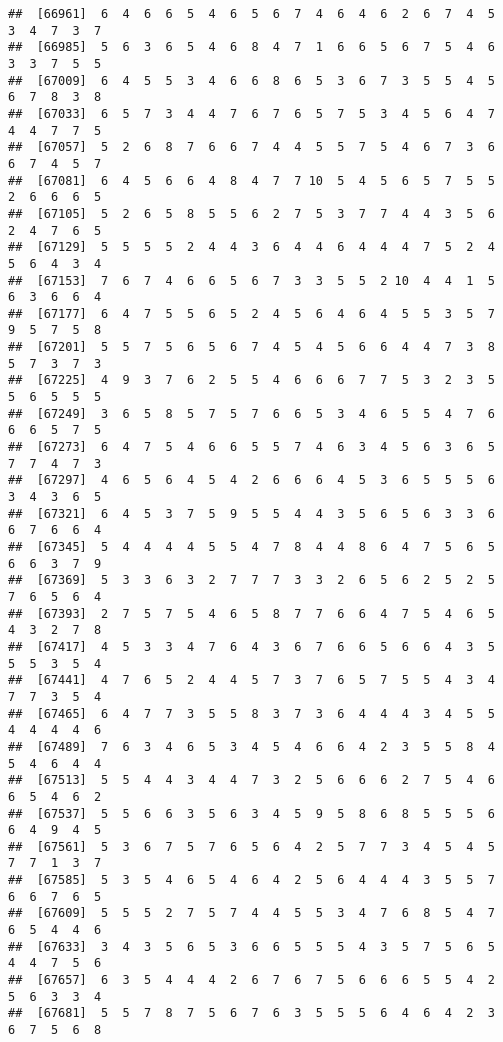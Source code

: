 \documentclass[
]{book}
\begin{document}
\begin{verbatim}
##  [66961]  6  4  6  6  5  4  6  5  6  7  4  6  4  6  2  6  7  4  5  3  4  7  3  7
##  [66985]  5  6  3  6  5  4  6  8  4  7  1  6  6  5  6  7  5  4  6  3  3  7  5  5
##  [67009]  6  4  5  5  3  4  6  6  8  6  5  3  6  7  3  5  5  4  5  6  7  8  3  8
##  [67033]  6  5  7  3  4  4  7  6  7  6  5  7  5  3  4  5  6  4  7  4  4  7  7  5
##  [67057]  5  2  6  8  7  6  6  7  4  4  5  5  7  5  4  6  7  3  6  6  7  4  5  7
##  [67081]  6  4  5  6  6  4  8  4  7  7 10  5  4  5  6  5  7  5  5  2  6  6  6  5
##  [67105]  5  2  6  5  8  5  5  6  2  7  5  3  7  7  4  4  3  5  6  2  4  7  6  5
##  [67129]  5  5  5  5  2  4  4  3  6  4  4  6  4  4  4  7  5  2  4  5  6  4  3  4
##  [67153]  7  6  7  4  6  6  5  6  7  3  3  5  5  2 10  4  4  1  5  6  3  6  6  4
##  [67177]  6  4  7  5  5  6  5  2  4  5  6  4  6  4  5  5  3  5  7  9  5  7  5  8
##  [67201]  5  5  7  5  6  5  6  7  4  5  4  5  6  6  4  4  7  3  8  5  7  3  7  3
##  [67225]  4  9  3  7  6  2  5  5  4  6  6  6  7  7  5  3  2  3  5  5  6  5  5  5
##  [67249]  3  6  5  8  5  7  5  7  6  6  5  3  4  6  5  5  4  7  6  6  6  5  7  5
##  [67273]  6  4  7  5  4  6  6  5  5  7  4  6  3  4  5  6  3  6  5  7  7  4  7  3
##  [67297]  4  6  5  6  4  5  4  2  6  6  6  4  5  3  6  5  5  5  6  3  4  3  6  5
##  [67321]  6  4  5  3  7  5  9  5  5  4  4  3  5  6  5  6  3  3  6  6  7  6  6  4
##  [67345]  5  4  4  4  4  5  5  4  7  8  4  4  8  6  4  7  5  6  5  6  6  3  7  9
##  [67369]  5  3  3  6  3  2  7  7  7  3  3  2  6  5  6  2  5  2  5  7  6  5  6  4
##  [67393]  2  7  5  7  5  4  6  5  8  7  7  6  6  4  7  5  4  6  5  4  3  2  7  8
##  [67417]  4  5  3  3  4  7  6  4  3  6  7  6  6  5  6  6  4  3  5  5  5  3  5  4
##  [67441]  4  7  6  5  2  4  4  5  7  3  7  6  5  7  5  5  4  3  4  7  7  3  5  4
##  [67465]  6  4  7  7  3  5  5  8  3  7  3  6  4  4  4  3  4  5  5  4  4  4  4  6
##  [67489]  7  6  3  4  6  5  3  4  5  4  6  6  4  2  3  5  5  8  4  5  4  6  4  4
##  [67513]  5  5  4  4  3  4  4  7  3  2  5  6  6  6  2  7  5  4  6  6  5  4  6  2
##  [67537]  5  5  6  6  3  5  6  3  4  5  9  5  8  6  8  5  5  5  6  6  4  9  4  5
##  [67561]  5  3  6  7  5  7  6  5  6  4  2  5  7  7  3  4  5  4  5  7  7  1  3  7
##  [67585]  5  3  5  4  6  5  4  6  4  2  5  6  4  4  4  3  5  5  7  6  6  7  6  5
##  [67609]  5  5  5  2  7  5  7  4  4  5  5  3  4  7  6  8  5  4  7  6  5  4  4  6
##  [67633]  3  4  3  5  6  5  3  6  6  5  5  5  4  3  5  7  5  6  5  4  4  7  5  6
##  [67657]  6  3  5  4  4  4  2  6  7  6  7  5  6  6  6  5  5  4  2  5  6  3  3  4
##  [67681]  5  5  7  8  7  5  6  7  6  3  5  5  5  6  4  6  4  2  3  6  7  5  6  8

\end{verbatim}
\end{document}
